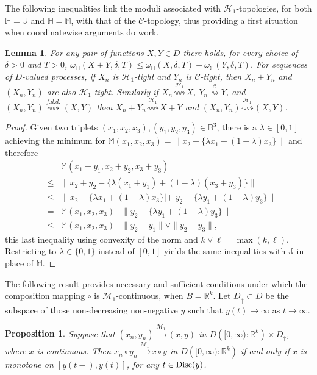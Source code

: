 \documentclass[final]{amsart}
\newtheorem{lem}[thm]{Lemma}
\newtheorem{prop}[thm]{Proposition}
\theoremstyle{definition}
\numberwithin{equation}{section}
\newcommand{\dB}{\ensuremath{\mathbb{B}}}
\newcommand{\dC}{\ensuremath{\mathbb{C}}}
\newcommand{\dH}{\ensuremath{\mathbb{H}}}
\newcommand{\dJ}{\ensuremath{\mathbb{J}}}
\newcommand{\dM}{\ensuremath{\mathbb{M}}}
\newcommand{\dR}{\ensuremath{\mathbb{R}}}
\newcommand{\cM}{\ensuremath{\mathcal{M}}}
\begin{document}
The following inequalities link the moduli associated with $\mathcal{H}_1$-topologies,
for both $\dH=\dJ$ and $\dH=\dM$, with that of the $\mathcal{C}$-topology,
thus providing a first situation when coordinatewise arguments do work.

\begin{lem}\label{lem:BasicInequality}
For any pair of functions $X, Y\in D$ there holds, for every choice of $\delta>0$ and $T>0$,
$\omega_\dH(X+Y,\delta,T)\le \omega_\dH(X,\delta,T)+\omega_\dC(Y,\delta,T)$.
For sequences of $D$-valued processes, if $X_n$ is $\mathcal{H}_1$-tight and
$Y_n$ is $\mathcal{C}$-tight, then $X_n+Y_n$ and $(X_n,Y_n)$ are also $\mathcal{H}_1$-tight.
Similarly if $X_n\stackrel{\mathcal{H}_1}{\rightsquigarrow} X$, $Y_n\stackrel{\mathcal{C}}{\rightsquigarrow} Y$, and
$(X_n,Y_n)\stackrel{f.d.d.}{\rightsquigarrow} (X,Y)$ then $X_n+Y_n\stackrel{\mathcal{H}_1}{\rightsquigarrow} X+Y$
and $(X_n,Y_n)\stackrel{\mathcal{H}_1}{\rightsquigarrow}(X,Y)$.
\end{lem}

\begin{proof} Given two triplets $(x_1,x_2,x_3), (y_1,y_2,y_3)\in \dB^3$, there is a $\lambda\in[0,1]$ achieving the minimum for
$\dM(x_1,x_2,x_3)=\|x_2-\{\lambda x_1+(1-\lambda)x_3\}\|$ and therefore
\begin{eqnarray*}
& & \dM(x_1+y_1,x_2+y_2,x_3+y_3) \\
& \le & \|x_2+y_2-\{\lambda (x_1+y_1)+(1-\lambda)(x_3+y_3)\}\| \\
& \le & \|x_2-\{\lambda x_1+(1-\lambda)x_3\}| + |y_2-\{\lambda y_1+(1-\lambda)y_3\}\| \\
& = & \dM(x_1,x_2,x_3) +  \|y_2-\{\lambda y_1+(1-\lambda)y_3\}\| \\
& \le& \dM(x_1,x_2,x_3) +  \|y_2-y_1\| \vee \|y_2-y_3\|,
\end{eqnarray*}
this last inequality using convexity of the norm and $k\vee\ell = \max(k,\ell)$.
Restricting to $\lambda\in\{0,1\}$ instead of $[0,1]$ yields the same inequalities with $\dJ$ in place of $\dM$.
\end{proof}

The following result provides necessary and sufficient conditions under which the
composition mapping $\circ$ is $\mathcal{M}_1$-continuous, when $B=\dR^k$.
Let $D_{\uparrow}\subset D$ be the subspace of those non-decreasing non-negative $y$ such that $y(t) \to\infty$ as $t\to\infty$.

\begin{prop}\label{prop:Whitt_composition}
Suppose that $(x_n, y_n) \stackrel{\cM_1}{\to} (x, y) $ in $D\left([0,\infty):\dR^k\right) \times  D_{\uparrow}$, where $x$ is continuous. Then
$x_n \circ y_n \stackrel{\cM_1}{\to}  x\circ  y$ in $D\left([0,\infty):\dR^k\right)$ if and only if $x$ is monotone on $[y(t-), y(t)]$,
for any $t\in {\rm Disc}(y)$.
\end{prop}
\end{document}
